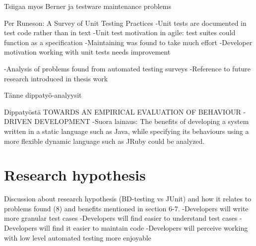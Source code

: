    Tsiigaa myos Berner ja testware maintenance problems~\cite{berner2005observations}

   Per Runeson: A Survey of Unit Testing Practices\newline
   -Unit tests are documented in test code rather than in text\newline
   -Unit test motivation in agile: test suites could function as a specification\newline
   -Maintaining was found to take much effort\newline
   -Developer motivation working with unit tests needs improvement\newline

   -Analysis of problems found from automated testing surveys\newline
   -Reference to future research introduced in thesis work\newline

   Tänne dippatyö-analyysit

   Dippatyöstä TOWARDS AN EMPIRICAL EVALUATION
               OF BEHAVIOUR - DRIVEN DEVELOPMENT\newline
   -Suora lainaus: The benefits of developing a system written in a static language such as Java, while specifying its
    behaviours using a more flexible dynamic language such as JRuby could be analyzed.\newline\newline
\section{Research hypothesis} %
    Discussion about research hypothesis (BD-testing vs JUnit) and how it relates to problems found (8) and benefits mentioned in section 6-7.\newline
    -Developers will write more granular test cases\newline
    -Developers will find easier to understand test cases\newline
    -Developers will find it easier to maintain code\newline
    -Developers will perceive working with low level automated testing more enjoyable\newline

